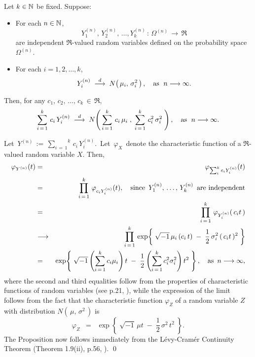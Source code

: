 \begin{proposition}\label{GaussianDistributionLimit}
\quad
Let $k \in \mathbb{N}$ be fixed.
Suppose:
\begin{itemize}
\item	For each $n \in \mathbb{N}$,
		\begin{equation*}
		Y^{(n)}_{1},\, Y^{(n)}_{2},\, \ldots, Y^{(n)}_{k} \,:\,\Omega^{(n)}\,\longrightarrow\,\Re
		\end{equation*}
		are independent $\Re$-valued random variables defined on the probability space $\Omega^{(n)}$.
\item	For each $i = 1, 2, \ldots, k$,
		\begin{equation*}
		Y^{(n)}_{i} \; \overset{d}{\longrightarrow} \; N\!\left(\,\mu_{i},\,\sigma^{2}_{i}\,\right),
		\quad
		\textnormal{as \;$n \longrightarrow \infty$}.
		\end{equation*}
\end{itemize}
Then, for any $c_{1},\, c_{2},\, \ldots,\, c_{k} \,\in\, \Re$,
\begin{equation*}
\sum_{i\,=\,1}^{k}\,c_{i}\,Y^{(n)}_{i} \; \overset{d}{\longrightarrow} \;
N\!\left(\,\sum_{i\,=\,1}^{k}\,c_{i}\,\mu_{i} \;,\; \sum_{i\,=\,1}^{k}\,c_{i}^{2}\,\sigma_{i}^{2}\;\right),
\quad
\textnormal{as \;$n \longrightarrow \infty$}.
\end{equation*}
\end{proposition}
\proof
Let \,$Y^{(n)} \,:=\, \overset{k}{\underset{i\,=\,1}{\sum}}\,c_{i}\,Y^{(n)}_{i}$.\,
Let \,$\varphi_{X}$\, denote the characteristic function of a $\Re$-valued random variable $X$.
Then,
\begin{eqnarray*}
\varphi_{Y^{(n)}}(t)
&=& \varphi_{\sum_{i}^{k}c_{i}Y^{(n)}_{i}}(t)
\\
&=& \prod_{i\,=\,1}^{k}\,\varphi_{c_{i}Y^{(n)}_{i}}(t),
\quad\textnormal{since \,$Y^{(n)}_{1},\, \ldots,\, Y^{(n)}_{k}$\, are independent}
\\
&=& \prod_{i\,=\,1}^{k}\,\varphi_{Y^{(n)}_{i}}(\,c_{i}t\,)
\\
&\longrightarrow&
\prod_{i\,=\,1}^{k}\,\exp\!\left\{\;\sqrt{-1}\,\mu_{i}\,(c_{i}\,t) \;-\; \dfrac{1}{2}\,\sigma_{i}^{2}\,(\,c_{i}t\,)^{2}\;\right\}
\\
&=&
\exp\!\left\{\;
	\sqrt{-1}\left(\sum_{i\,=\,1}^{k}c_{i}\mu_{i}\right)t
	\;-\; \dfrac{1}{2}\left(\sum_{i\,=\,1}^{k}c_{i}^{2}\sigma_{i}^{2}\right)t^{2}
	\;\right\},
\quad\textnormal{as \,$n \longrightarrow \infty$},
\end{eqnarray*}
where the second and third equalities follow from the properties of
characteristic functions of random variables (see p.21, \cite{Ferguson1996}),
while the expression of the limit follows from the fact that the characteristic
function $\varphi_{Z}$ of a random variable $Z$ with distribution
$N\!\left(\,\mu,\,\sigma^{2}\,\right)$ is
\begin{equation*}
\varphi_{Z}
\;\;=\;\;
\exp\!\left\{\;\sqrt{-1}\,\mu t \;-\; \dfrac{1}{2}\,\sigma^{2}\,t^{2}\;\right\}.
\end{equation*}
The Proposition now follows immediately from
the L\'{e}vy-Cram\'{e}r Continuity Theorem (Theorem 1.9(ii), p.56, \cite{Shao2003}).
\qed

